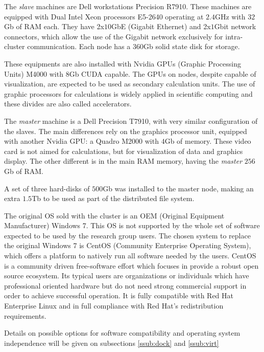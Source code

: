 \documentclass[twoside,a4paper,12pt,english]{inac17}
\begin{document}
The \textit{slave} machines are Dell workstations Precision R7910. These machines are equipped
with Dual Intel{\textregistered} Xeon{\textregistered} processors E5-2640 operating at $2.4$GHz with
$32$Gb of RAM each. They have 2x$10$GbE (Gigabit Ethernet) and 2x$1$Gbit network connectors, which
allow the use of the Gigabit network exclusively for intra-cluster communication. Each node
has a $360$Gb solid state disk for storage.

These equipments are also installed with Nvidia{\textregistered} GPUs (Graphic Processing Units) M4000{\textregistered} with $8$Gb CUDA\cite{CUDA} capable.
The GPUs on nodes, despite capable of visualization, are expected to be used as secondary calculation units.
The use of graphic processors for calculations is widely applied in scientific computing and these divides
are also called accelerators\cite{accelerators}.

The \textit{master} machine is a Dell Precision T7910, with very similar configuration of the slaves. The main
differences rely on the graphics processor unit, equipped with another Nvidia{\textregistered} GPU: a
Quadro{\textregistered} M2000 with $4$Gb of memory. These video card is not aimed for calculations, but for
visualization of data and graphics display. The other different is in the main RAM memory, having the \textit{master}
$256$Gb of RAM. 

A set of three hard-disks of $500$Gb was installed to the master node, making an extra $1.5$Tb to be used as part
of the distributed file system.

The original OS sold with the cluster is an OEM (Original Equipment Manufacturer) Windows 7{\textregistered}\cite{windows7}. This
OS is not supported by the whole set of software expected to be used by the research group users. The chosen
system to replace the original Windows 7 is CentOS (Community Enterprise Operating System)\cite{centos}, which offers a platform to natively run all
software needed by the users. CentOS is a community driven free-software effort which focuses in provide a robust open source ecosystem.
Its typical users are organizations or individuals which have professional oriented hardware but do not need strong commercial support
in order to achieve successful operation. It is fully compatible with Red Hat Enterprise Linux and in full compliance with Red Hat's
redistribution requirements.

Details on possible options for software compatibility and operating system independence will be given on subsections \ref{ssub:dock} and \ref{ssub:virt}
\end{document}
